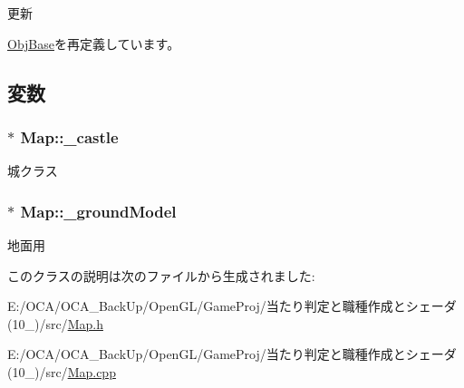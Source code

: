 更新 



\hyperlink{class_obj_base_a83992aba2dcaf6d3548dd17618b4b0b9}{Obj\-Base}を再定義しています。



\subsection{変数}
\hypertarget{class_map_a0abc1c10ba71a6b98e6a8edaf89f45f0}{
\subsubsection[{\-\_\-castle}]{$\ast$ Map\-::\-\_\-castle\hspace{0.3cm}{\ttfamily [protected]}}}\label{class_map_a0abc1c10ba71a6b98e6a8edaf89f45f0}


城クラス 

\hypertarget{class_map_a9bef20a674f52ee4013d7d81429ab5d2}{
\subsubsection[{\-\_\-ground\-Model}]{$\ast$ Map\-::\-\_\-ground\-Model\hspace{0.3cm}{\ttfamily [protected]}}}\label{class_map_a9bef20a674f52ee4013d7d81429ab5d2}


地面用 



このクラスの説明は次のファイルから生成されました\-:\begin{DoxyCompactItemize}
\item 
E\-:/\-O\-C\-A/\-O\-C\-A\-\_\-\-Back\-Up/\-Open\-G\-L/\-Game\-Proj/当たり判定と職種作成とシェーダ(10\-\_)/src/\hyperlink{_map_8h}{Map.\-h}\item 
E\-:/\-O\-C\-A/\-O\-C\-A\-\_\-\-Back\-Up/\-Open\-G\-L/\-Game\-Proj/当たり判定と職種作成とシェーダ(10\-\_)/src/\hyperlink{_map_8cpp}{Map.\-cpp}\end{DoxyCompactItemize}
